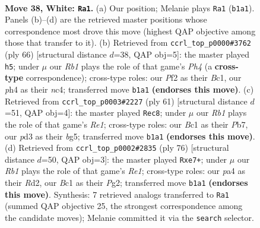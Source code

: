 \documentclass[11pt]{article}
\begin{document}
\clearpage

\begin{figure}[p]\centering
\begin{subfigure}{0.46\textwidth}\centering
\resizebox{\linewidth}{!}{%
\newchessgame
\chessboard[
  setfen={5k1r/5p1r/5n2/8/p3p2p/3p3P/PP3PR1/1RB1K3 w - - 16 38},
  showmover=false,
  pgfstyle=straightmove, color=movearrow, markmove={b1-a1}
]}
\caption{}
\end{subfigure}\hfill
\begin{subfigure}{0.46\textwidth}\centering
\resizebox{\linewidth}{!}{%
\newchessgame
\chessboard[
  setfen={3r4/3r2p1/2pk4/p3p3/P1n1P1RP/2P5/2K1R3/2B5 w - - 3 34},
  showmover=false,
  pgfstyle=straightmove, color=movearrow, markmove={h4-h5}
]}
\caption{}
\end{subfigure}
\\[4pt]
\begin{subfigure}{0.46\textwidth}\centering
\resizebox{\linewidth}{!}{%
\newchessgame
\chessboard[
  setfen={4r3/1p3k2/p1rpp3/6Bp/3bP2P/5P2/PP6/1K2RR2 b - - 3 31},
  showmover=false,
  pgfstyle=straightmove, color=movearrow, markmove={e8-c8}
]}
\caption{}
\end{subfigure}\hfill
\begin{subfigure}{0.46\textwidth}\centering
\resizebox{\linewidth}{!}{%
\newchessgame
\chessboard[
  setfen={r1r1n3/pp2n1k1/7p/1BP2pp1/8/8/P2R1PP1/4R1K1 w - - 0 39},
  showmover=false,
  pgfstyle=straightmove, color=movearrow, markmove={e1-e7}
]}
\caption{}
\end{subfigure}
\caption{\textbf{Move 38, White: \texttt{Ra1}.} (a) Our position; Melanie plays \texttt{Ra1} (\texttt{b1a1}). Panels (b)--(d) are the retrieved master positions whose correspondence most drove this move (highest QAP objective among those that transfer to it). (b) Retrieved from \texttt{ccrl\_top\_p0000\#3762} (ply 66) [structural distance $d$=38, QAP obj=5]: the master played \texttt{h5}; under $\mu$ our \emph{Rb1} plays the role of that game's \emph{Ph4} (a \textbf{cross-type} correspondence); cross-type roles: our \emph{P}f2 as their \emph{B}c1, our \emph{p}h4 as their \emph{n}c4; transferred move \texttt{b1a1} \textbf{(endorses this move)}. (c) Retrieved from \texttt{ccrl\_top\_p0003\#2227} (ply 61) [structural distance $d$=51, QAP obj=4]: the master played \texttt{Rec8}; under $\mu$ our \emph{Rb1} plays the role of that game's \emph{Re1}; cross-type roles: our \emph{B}c1 as their \emph{P}b7, our \emph{p}d3 as their \emph{b}g5; transferred move \texttt{b1a1} \textbf{(endorses this move)}. (d) Retrieved from \texttt{ccrl\_top\_p0002\#2835} (ply 76) [structural distance $d$=50, QAP obj=3]: the master played \texttt{Rxe7+}; under $\mu$ our \emph{Rb1} plays the role of that game's \emph{Re1}; cross-type roles: our \emph{p}a4 as their \emph{R}d2, our \emph{B}c1 as their \emph{P}g2; transferred move \texttt{b1a1} \textbf{(endorses this move)}. Synthesis: 7 retrieved analogs transferred to \texttt{Ra1} (summed QAP objective 25, the strongest correspondence among the candidate moves); Melanie committed it via the \texttt{search} selector.}
\label{fig:thought-m74}
\end{figure}
\end{document}
